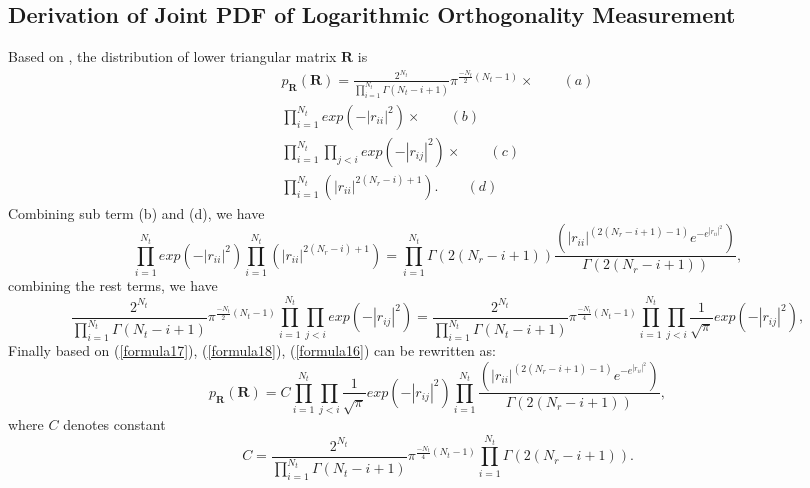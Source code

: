 \documentclass[12pt,letter,final]{article}
\begin{document}
\begin{spacing}{2.5}
\section{Derivation of Joint PDF of Logarithmic Orthogonality Measurement}
Based on \cite{srivastava1965complex}, the distribution of lower triangular matrix $\mathbf{R}$ is 
\begin{eqnarray}
\nonumber
p_{\mathbf{R}}(\mathbf{R})=\frac{2^{N_{t}}}{\prod_{i=1}^{N_{t}}\Gamma(N_{t}-i+1)}\pi^{\frac{-N_{t}}{2}(N_{t}-1)}\times \quad \quad (a)\\
\nonumber
\prod_{i=1}^{N_{t}}exp(-|r_{ii}|^{2})\times \quad \quad (b)\\
\nonumber
\prod_{i=1}^{N_{t}}\prod_{j<i}exp(-|r_{ij}|^{2})\times \quad \quad (c)\\
\prod_{i=1}^{N_{t}}(|r_{ii}|^{2(N_{r}-i)+1}). \quad \quad (d)
\label{formula16}
\end{eqnarray}
Combining sub term (b) and (d), we have
\begin{equation}
\prod_{i=1}^{N_{t}}exp(-|r_{ii}|^{2})\prod_{i=1}^{N_{t}}(|r_{ii}|^{2(N_{r}-i)+1})=\prod_{i=1}^{N_{t}}\Gamma(2(N_{r}-i+1))\frac{(|r_{ii}|^{(2(N_{r}-i+1)-1)}e^{-e^{|r_{ii}|^{2}}})}{\Gamma(2(N_{r}-i+1))},
\label{formula17}
\end{equation}
combining the rest terms, we have 
\begin{equation}
\frac{2^{N_{t}}}{\prod_{i=1}^{N_{t}}\Gamma(N_{t}-i+1)}\pi^{\frac{-N_{t}}{2}(N_{t}-1)}\prod_{i=1}^{N_{t}}\prod_{j<i}exp(-|r_{ij}|^{2})=\frac{2^{N_{t}}}{\prod_{i=1}^{N_{t}}\Gamma(N_{t}-i+1)}\pi^{\frac{-N_{t}}{4}(N_{t}-1)}\prod_{i=1}^{N_{t}}\prod_{j<i}\frac{1}{\sqrt{\pi}}exp(-|r_{ij}|^{2}),
\label{formula18}
\end{equation}
Finally based on (\ref{formula17}), (\ref{formula18}), (\ref{formula16}) can be rewritten as:
\begin{equation}
p_{\mathbf{R}}(\mathbf{R})=C\prod_{i=1}^{N_{t}}\prod_{j<i}\frac{1}{\sqrt{\pi}}exp(-|r_{ij}|^{2})
\prod_{i=1}^{N_{t}}\frac{(|r_{ii}|^{(2(N_{r}-i+1)-1)}e^{-e^{|r_{ii}|^{2}}})}{\Gamma(2(N_{r}-i+1))},
\label{formula19}
\end{equation}
where $C$ denotes constant
\begin{equation}
C=\frac{2^{N_{t}}}{\prod_{i=1}^{N_{t}}\Gamma(N_{t}-i+1)}\pi^{\frac{-N_{t}}{4}(N_{t}-1)}\prod_{i=1}^{N_{t}}\Gamma(2(N_{r}-i+1)).
\label{formula20}
\end{equation}



\end{spacing}
\end{document}
